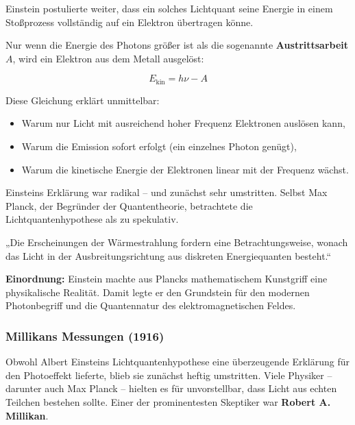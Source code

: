 Einstein postulierte weiter, dass ein solches Lichtquant seine Energie in einem Stoßprozess vollständig auf ein Elektron übertragen könne. 

Nur wenn die Energie des Photons größer ist als die sogenannte \textbf{Austrittsarbeit} \( A \), wird ein Elektron aus dem Metall ausgelöst:

\[
E_{\text{kin}} = h \nu - A
\]

Diese Gleichung erklärt unmittelbar:
\begin{itemize}
	\item Warum nur Licht mit ausreichend hoher Frequenz Elektronen auslösen kann,
	\item Warum die Emission sofort erfolgt (ein einzelnes Photon genügt),
	\item Warum die kinetische Energie der Elektronen linear mit der Frequenz wächst.
\end{itemize}

Einsteins Erklärung war radikal – und zunächst sehr umstritten. Selbst Max Planck, der Begründer der Quantentheorie, betrachtete die Lichtquantenhypothese als zu spekulativ.

\medskip
\begin{tcolorbox}[physikbox, title=Albert Einstein (1905)\textit{ \cite{einstein1905}} ]
	\label{die Erscheinung der Wärm}
	\small
	„Die Erscheinungen der Wärmestrahlung fordern eine Betrachtungsweise, wonach das Licht in der Ausbreitungsrichtung aus diskreten Energiequanten besteht.“
\end{tcolorbox}
\medskip
\textbf{Einordnung:} Einstein machte aus Plancks mathematischem Kunstgriff eine physikalische Realität. Damit legte er den Grundstein für den modernen Photonbegriff und die Quantennatur des elektromagnetischen Feldes.

\subsubsection{Millikans Messungen (1916)}

Obwohl Albert Einsteins Lichtquantenhypothese eine überzeugende Erklärung für den Photoeffekt lieferte, blieb sie zunächst heftig umstritten. Viele Physiker – darunter auch Max Planck – hielten es für unvorstellbar, dass Licht aus echten Teilchen bestehen sollte. Einer der prominentesten Skeptiker war \textbf{Robert A. Millikan}.

